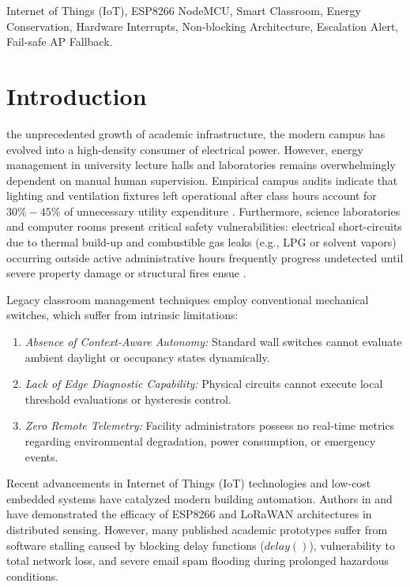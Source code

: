 \documentclass[conference]{IEEEtran}
\begin{document}
\begin{IEEEkeywords}
Internet of Things (IoT), ESP8266 NodeMCU, Smart Classroom, Energy Conservation, Hardware Interrupts, Non-blocking Architecture, Escalation Alert, Fail-safe AP Fallback.
\end{IEEEkeywords}

\section{Introduction}
 the unprecedented growth of academic infrastructure, the modern campus has evolved into a high-density consumer of electrical power. However, energy management in university lecture halls and laboratories remains overwhelmingly dependent on manual human supervision. Empirical campus audits indicate that lighting and ventilation fixtures left operational after class hours account for $30\% - 45\%$ of unnecessary utility expenditure \cite{ref_energy_waste}. Furthermore, science laboratories and computer rooms present critical safety vulnerabilities: electrical short-circuits due to thermal build-up and combustible gas leaks (e.g., LPG or solvent vapors) occurring outside active administrative hours frequently progress undetected until severe property damage or structural fires ensue \cite{ref_safety_hazard}.

Legacy classroom management techniques employ conventional mechanical switches, which suffer from intrinsic limitations:
\begin{enumerate}
    \item \textit{Absence of Context-Aware Autonomy:} Standard wall switches cannot evaluate ambient daylight or occupancy states dynamically.
    \item \textit{Lack of Edge Diagnostic Capability:} Physical circuits cannot execute local threshold evaluations or hysteresis control.
    \item \textit{Zero Remote Telemetry:} Facility administrators possess no real-time metrics regarding environmental degradation, power consumption, or emergency events.
\end{enumerate}

Recent advancements in Internet of Things (IoT) technologies and low-cost embedded systems have catalyzed modern building automation. Authors in \cite{ref_iot_irrigation} and \cite{ref_air_quality} have demonstrated the efficacy of ESP8266 and LoRaWAN architectures in distributed sensing. However, many published academic prototypes suffer from software stalling caused by blocking delay functions ($delay()$), vulnerability to total network loss, and severe email spam flooding during prolonged hazardous conditions.
\end{document}
